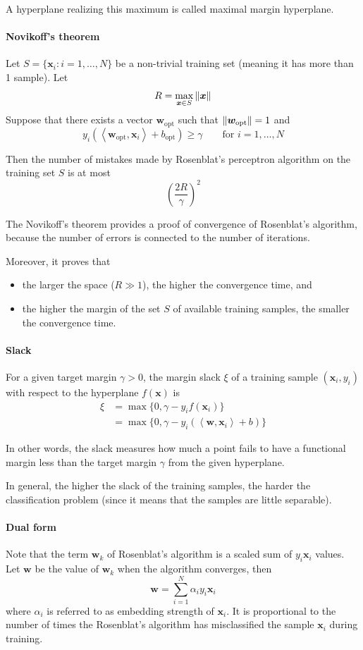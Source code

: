 \documentclass[oneside,onecolumn]{report}
\newcommand{\inp}[2]{\left\langle #1, #2 \right\rangle}
\begin{document}
A hyperplane realizing this maximum is called maximal margin hyperplane.

\paragraph{Novikoff's theorem}
Let $S = \{ \bm x_i: i = 1, \dots, N \}$ be a non-trivial training set (meaning it has more than 1 sample).
Let
$$ R = \max_{\bm x \in S} \norm{\bm x} $$
Suppose that there exists a vector $\bm w_\text{opt}$ such that $\norm{\bm w_\text{opt}} = 1$ and
$$ y_i \left( \inp{\bm w_\text{opt}}{\bm x_i} + b_\text{opt} \right) \geq \gamma \qquad \text{for } i = 1, \dots, N $$

Then the number of mistakes made by Rosenblat's perceptron algorithm on the training set $S$ is at most
$$ \left( \frac{2 R}{\gamma} \right)^2 $$

The Novikoff's theorem provides a proof of convergence of Rosenblat's algorithm, because the number of errors is connected to the number of iterations.

Moreover, it proves that
\begin{itemize}
    \item the larger the space ($R \gg 1$), the higher the convergence time, and
    \item the higher the margin of the set $S$ of available training samples, the smaller the convergence time.
\end{itemize}

\paragraph{Slack}
For a given target margin $\gamma > 0$, the margin slack $\xi$ of a training sample $(\bm x_i, y_i)$ with respect to the hyperplane $f(\bm x)$ is
\begin{align*}
\xi
&= \max\{ 0, \gamma - y_i f(\bm x_i) \} \\
&= \max\{ 0, \gamma - y_i (\inp{\bm w}{\bm x_i} + b) \}
\end{align*}

In other words, the slack measures how much a point fails to have a functional margin less than the target margin $\gamma$ from the given hyperplane.

In general, the higher the slack of the training samples, the harder the classification problem (since it means that the samples are little separable).

\paragraph{Dual form}
Note that the term $\bm w_k$ of Rosenblat's algorithm is a scaled sum of $y_i \bm x_i$ values.
Let $\bm w$ be the value of $\bm w_k$ when the algorithm converges, then
$$ \bm w = \sum_{i = 1}^N \alpha_i y_i \bm x_i $$
where $\alpha_i$ is referred to as embedding strength of $\bm x_i$.
It is proportional to the number of times the Rosenblat's algorithm has misclassified the sample $\bm x_i$ during training.
\end{document}
